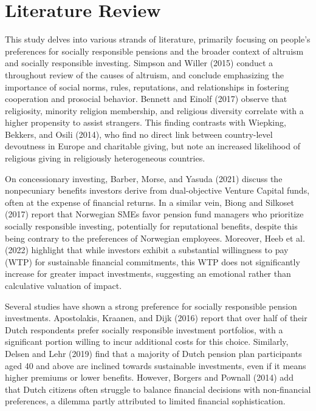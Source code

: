 \documentclass[
  12pt,
]{article}
\begin{document}
\hypertarget{literature-review}{%
\section{Literature Review}\label{literature-review}}

This study delves into various strands of literature, primarily focusing on people's preferences for socially responsible pensions and the broader context of altruism and socially responsible investing. Simpson and Willer (2015) conduct a throughout review of the causes of altruism, and conclude emphasizing the importance of social norms, rules, reputations, and relationships in fostering cooperation and prosocial behavior. Bennett and Einolf (2017) observe that religiosity, minority religion membership, and religious diversity correlate with a higher propensity to assist strangers. This finding contrasts with Wiepking, Bekkers, and Osili (2014), who find no direct link between country-level devoutness in Europe and charitable giving, but note an increased likelihood of religious giving in religiously heterogeneous countries.

On concessionary investing, Barber, Morse, and Yasuda (2021) discuss the nonpecuniary benefits investors derive from dual-objective Venture Capital funds, often at the expense of financial returns. In a similar vein, Biong and Silkoset (2017) report that Norwegian SMEs favor pension fund managers who prioritize socially responsible investing, potentially for reputational benefits, despite this being contrary to the preferences of Norwegian employees. Moreover, Heeb et al. (2022) highlight that while investors exhibit a substantial willingness to pay (WTP) for sustainable financial commitments, this WTP does not significantly increase for greater impact investments, suggesting an emotional rather than calculative valuation of impact.

Several studies have shown a strong preference for socially responsible pension investments. Apostolakis, Kraanen, and Dijk (2016) report that over half of their Dutch respondents prefer socially responsible investment portfolios, with a significant portion willing to incur additional costs for this choice. Similarly, Delsen and Lehr (2019) find that a majority of Dutch pension plan participants aged 40 and above are inclined towards sustainable investments, even if it means higher premiums or lower benefits. However, Borgers and Pownall (2014) add that Dutch citizens often struggle to balance financial decisions with non-financial preferences, a dilemma partly attributed to limited financial sophistication.
\end{document}
